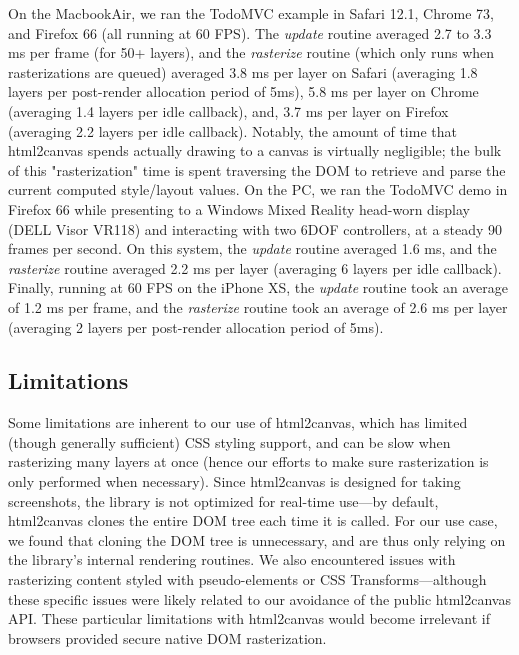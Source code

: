 \documentclass[sigconf]{acmart}
\begin{document}
On the MacbookAir, we ran the TodoMVC example in Safari 12.1, Chrome 73, and Firefox 66 (all running at 60 FPS). The \textit{update} routine averaged 2.7 to 3.3 ms per frame (for 50+ layers), and the \textit{rasterize} routine (which only runs when rasterizations are queued) averaged 3.8 ms per layer on Safari (averaging 1.8 layers per post-render allocation period of 5ms), 5.8 ms per layer on Chrome (averaging 1.4 layers per idle callback), and, 3.7 ms per layer on Firefox (averaging 2.2 layers per idle callback). Notably, the amount of time that html2canvas spends actually drawing to a canvas is virtually negligible; the bulk of this "rasterization" time is spent traversing the DOM to retrieve and parse the current computed style/layout values.
On the PC, we ran the TodoMVC demo in Firefox 66 while presenting to a Windows Mixed Reality head-worn display (DELL Visor VR118) and interacting with two 6DOF controllers, at a steady 90 frames per second. On this system, the \textit{update} routine averaged 1.6 ms, and the \textit{rasterize} routine averaged 2.2 ms per layer (averaging 6 layers per idle callback). Finally, running at 60 FPS on the iPhone XS, the \textit{update} routine took an average of 1.2 ms per frame, and the \textit{rasterize} routine took an average of 2.6 ms per layer (averaging 2 layers per post-render allocation period of 5ms). 

\subsection{Limitations}
Some limitations are inherent to our use of html2canvas, which has limited (though generally sufficient) CSS styling support, and can be slow when rasterizing many layers at once (hence our efforts to make sure rasterization is only performed when necessary). Since html2canvas is designed for taking screenshots, the library is not optimized for real-time use---by default, html2canvas clones the entire DOM tree each time it is called. For our use case, we found that cloning the DOM tree is unnecessary, and are thus only relying on the library's internal rendering routines. We also encountered issues with rasterizing content styled with pseudo-elements or CSS Transforms---although these specific issues were likely related to our avoidance of the public html2canvas API. These particular limitations with html2canvas would become irrelevant if browsers provided secure native DOM rasterization. 
\end{document}

